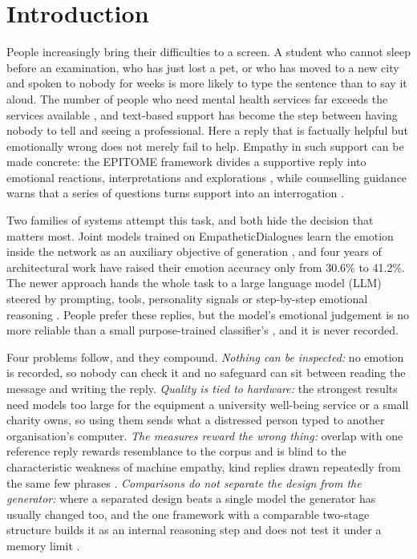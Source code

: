 \documentclass[conference]{IEEEtran}
\begin{document}
\section{Introduction}
People increasingly bring their difficulties to a screen. A student who cannot sleep before an examination, who has just lost a pet, or who has moved to a new city and spoken to nobody for weeks is more likely to type the sentence than to say it aloud. The number of people who need mental health services far exceeds the services available \cite{b1}, and text-based support has become the step between having nobody to tell and seeing a professional. Here a reply that is factually helpful but emotionally wrong does not merely fail to help. Empathy in such support can be made concrete: the EPITOME framework divides a supportive reply into emotional reactions, interpretations and explorations \cite{b2}, while counselling guidance warns that a series of questions turns support into an interrogation \cite{b3}.

Two families of systems attempt this task, and both hide the decision that matters most. Joint models trained on EmpatheticDialogues learn the emotion inside the network as an auxiliary objective of generation \cite{b4,b5,b6,b7,b8,b9,b10}, and four years of architectural work have raised their emotion accuracy only from 30.6\% to 41.2\%. The newer approach hands the whole task to a large language model (LLM) steered by prompting, tools, personality signals or step-by-step emotional reasoning \cite{b11,b12,b13,b14,b15}. People prefer these replies, but the model's emotional judgement is no more reliable than a small purpose-trained classifier's \cite{b16,b17}, and it is never recorded.

Four problems follow, and they compound. \textit{Nothing can be inspected:} no emotion is recorded, so nobody can check it and no safeguard can sit between reading the message and writing the reply. \textit{Quality is tied to hardware:} the strongest results need models too large for the equipment a university well-being service or a small charity owns, so using them sends what a distressed person typed to another organisation's computer. \textit{The measures reward the wrong thing:} overlap with one reference reply rewards resemblance to the corpus and is blind to the characteristic weakness of machine empathy, kind replies drawn repeatedly from the same few phrases \cite{b18}. \textit{Comparisons do not separate the design from the generator:} where a separated design beats a single model the generator has usually changed too, and the one framework with a comparable two-stage structure builds it as an internal reasoning step and does not test it under a memory limit \cite{b19}.
\end{document}
